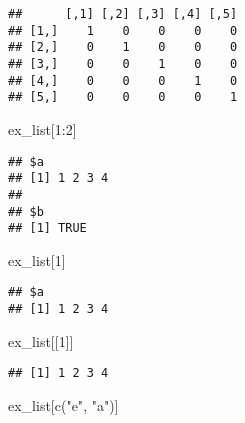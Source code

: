 \documentclass[
]{article}
\newenvironment{Shaded}{\begin{snugshade}}{\end{snugshade}}
\newcommand{\CommentTok}[1]{\textcolor[rgb]{0.56,0.35,0.01}{\textit{#1}}}
\newcommand{\DecValTok}[1]{\textcolor[rgb]{0.00,0.00,0.81}{#1}}
\newcommand{\FunctionTok}[1]{\textcolor[rgb]{0.00,0.00,0.00}{#1}}
\newcommand{\NormalTok}[1]{#1}
\newcommand{\SpecialCharTok}[1]{\textcolor[rgb]{0.00,0.00,0.00}{#1}}
\newcommand{\StringTok}[1]{\textcolor[rgb]{0.31,0.60,0.02}{#1}}
\begin{document}
\begin{Shaded}
\end{Shaded}

\begin{verbatim}
##      [,1] [,2] [,3] [,4] [,5]
## [1,]    1    0    0    0    0
## [2,]    0    1    0    0    0
## [3,]    0    0    1    0    0
## [4,]    0    0    0    1    0
## [5,]    0    0    0    0    1
\end{verbatim}

\begin{Shaded}
\begin{Highlighting}[]
\NormalTok{ex\_list[}\DecValTok{1}\SpecialCharTok{:}\DecValTok{2}\NormalTok{]}
\end{Highlighting}
\end{Shaded}

\begin{verbatim}
## $a
## [1] 1 2 3 4
## 
## $b
## [1] TRUE
\end{verbatim}

\begin{Shaded}
\begin{Highlighting}[]
\NormalTok{ex\_list[}\DecValTok{1}\NormalTok{]}
\end{Highlighting}
\end{Shaded}

\begin{verbatim}
## $a
## [1] 1 2 3 4
\end{verbatim}

\begin{Shaded}
\begin{Highlighting}[]
\NormalTok{ex\_list[[}\DecValTok{1}\NormalTok{]]}
\end{Highlighting}
\end{Shaded}

\begin{verbatim}
## [1] 1 2 3 4
\end{verbatim}

\begin{Shaded}
\begin{Highlighting}[]
\NormalTok{ex\_list[}\FunctionTok{c}\NormalTok{(}\StringTok{"e"}\NormalTok{, }\StringTok{"a"}\NormalTok{)]}
\end{Highlighting}
\end{Shaded}
\end{document}
